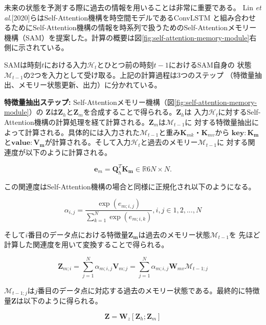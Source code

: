 未来の状態を予測する際に過去の情報を用いることは非常に重要である。
Lin \textit{et al}.[2020]らはSelf-Attention機構を時空間モデルであるConvLSTM
と組み合わせるためにSelf-Attention機構の情報を時系列で扱うためのSelf-Attentionメモリー
機構（SAM）を提案した。計算の概要は図\ref{fig:self-attention-memory-module}右
側に示されている。

SAMは時刻$t$における入力$\mathcal{H}_{t}$とひとつ前の時刻$t-1$におけるSAM自身の
状態$\mathcal{M}_{t-1}$の2つを入力として受け取る。上記の計算過程は3つのステップ
（特徴量抽出、メモリー状態更新、出力）に分かれている。

\textbf{特徴量抽出ステップ: }Self-Attentionメモリー機構（図\ref{fig:self-attention-memory-module}）の
$\boldsymbol{Z}$は$\boldsymbol{Z}_{h}$と$\boldsymbol{Z}_{m}$を合成することで得られる。$\boldsymbol{Z}_{h}$は
入力$\mathcal{H}_{t}$に対するSelf-Attention機構の計算処理を経て計算される。$\boldsymbol{Z}_{m}$は$\mathcal{M}_{t-1}$に
対する特徴量抽出によって計算される。具体的には入力された$\mathcal{M}_{t-1}$と重み$\boldsymbol{K}_{mk}$・$\boldsymbol{K}_{mv}$から
$\boldsymbol{key : K_{m}}$と$\boldsymbol{value : V_{m}}$が計算される。そして入力$\mathcal{H}_{t}$と過去のメモリー$\mathcal{M}_{t-1}$に
対する関連度が以下のように計算される。

\begin{equation}
\boldsymbol{e}_{m} = \boldsymbol{Q}_{h}^T\boldsymbol{K_{m}} \in \mathbb{R}6{N \times N}.
\end{equation}

この関連度はSelf-Attention機構の場合と同様に正規化され以下のようになる。

\begin{equation}
\alpha_{i,j} = \frac{\exp(e_{m;i,j})}{\sum_{k=1}^N\exp(e_{m;i,k})}, i,j \in {1, 2, ..., N}
\end{equation}

そして$i$番目のデータ点における特徴量$\boldsymbol{Z_{m}}$は過去のメモリー状態$\mathcal{M}_{t-1}$を
先ほど計算した関連度を用いて変換することで得られる。

\begin{equation}
\boldsymbol{Z}_{m;i} = \sum_{j=1}^N\alpha_{m;i,j}\boldsymbol{V}_{m;j} = \sum_{j=1}^N\alpha_{m;i,j}\boldsymbol{W}_{mv}\mathcal{M}_{t-1;j}
\end{equation}

$\mathcal{M}_{t-1;j}$は$j$番目のデータ点に対応する過去のメモリー状態である。最終的に特徴量$\boldsymbol{Z}$は以下のように得られる。

\begin{equation}
\boldsymbol{Z} = \boldsymbol{W}_{z}[\boldsymbol{Z}_{h};\boldsymbol{Z}_{m}]
\end{equation}

